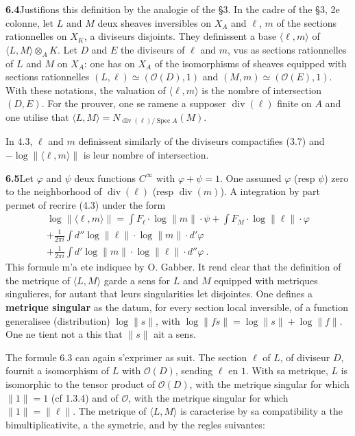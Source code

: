 \documentclass[12pt,a4paper]{article}
\theoremstyle{plain}
\theoremstyle{definition}
\theoremstyle{remark}
\DeclareMathOperator{\divm}{div}
\DeclareMathOperator{\Spec}{Spec}
\newcommand{\calO}{\mathcal{O}}
\begin{document}
\medskip
\noindent\textbf{6.4}\quad Justifions this definition by the analogie of the \S 3. In the cadre of the \S 3, 2e colonne, let $L$ and $M$ deux sheaves inversibles on $X_A$ and $\ell$, $m$ of the sections rationnelles on $X_K$, a diviseurs disjoints. They definissent a base $\langle \ell, m \rangle$ of $\langle L, M \rangle \otimes_A K$. Let $D$ and $E$ the diviseurs of $\ell$ and $m$, vus as sections rationnelles of $L$ and $M$ on $X_A$: one has on $X_A$ of the isomorphisms of sheaves equipped with sections rationnelles $(L, \ell) \simeq (\calO(D), 1)$ and $(M, m) \simeq (\calO(E), 1)$. With these notations, the valuation of $\langle \ell, m \rangle$ is the nombre of intersection $(D, E)$. For the prouver, one se ramene a supposer $\divm(\ell)$ finite on $A$ and one utilise that $\langle L, M \rangle = N_{\divm(\ell)/\Spec A}(M)$.

In 4.3, $\ell$ and $m$ definissent similarly of the diviseurs compactifies (3.7) and $-\log \| \langle \ell, m \rangle \|$ is leur nombre of intersection.

\medskip
\noindent\textbf{6.5}\quad Let $\varphi$ and $\psi$ deux functions $C^\infty$ with $\varphi + \psi = 1$. One assumed $\varphi$ (resp $\psi$) zero to the neighborhood of $\divm(\ell)$ (resp $\divm(m)$). A integration by part permet of recrire (4.3) under the form
\begin{equation}
\label{eq:6.5.1}
\begin{aligned}
\log \| \langle \ell, m \rangle \| = \int F_\ell \cdot \log \|m\| \cdot \psi + \int F_M \cdot \log \|\ell\| \cdot \varphi \\
+ \frac{1}{2\pi i} \int d'' \log \|\ell\| \cdot \log \|m\| \cdot d'\varphi \\
+ \frac{1}{2\pi i} \int d' \log \|m\| \cdot \log \|\ell\| \cdot d''\varphi \ .
\end{aligned}
\end{equation}
This formule m'a ete indiquee by O. Gabber. It rend clear that the definition of the metrique of $\langle L, M \rangle$ garde a sens for $L$ and $M$ equipped with metriques singulieres, for autant that leurs singularities let disjointes. One defines a \textbf{metrique singular} as the datum, for every section local inversible, of a function generalisee (distribution) $\log \|s\|$, with $\log \|fs\| = \log \|s\| + \log \|f\|$. One ne tient not a this that $\|s\|$ ait a sens.

The formule 6.3 can again s'exprimer as suit. The section $\ell$ of $L$, of diviseur $D$, fournit a isomorphism of $L$ with $\calO(D)$, sending $\ell$ en $1$. With sa metrique, $L$ is isomorphic to the tensor product of $\calO(D)$, with the metrique singular for which $\|1\| = 1$ (cf 1.3.4) and of $\calO$, with the metrique singular for which $\|1\| = \|\ell\|$. The metrique of $\langle L, M \rangle$ is caracterise by sa compatibility a the bimultiplicativite, a the symetrie, and by the regles suivantes:
\end{document}
